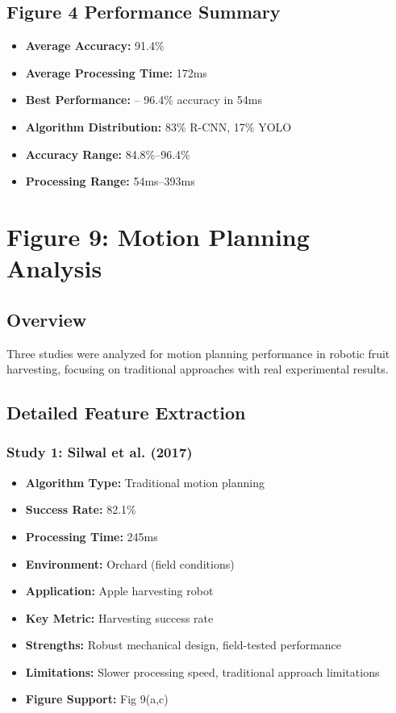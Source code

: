 \documentclass[11pt]{article}
\begin{document}
\subsection{Figure 4 Performance Summary}
\begin{itemize}
    \item \textbf{Average Accuracy:} 91.4\%
    \item \textbf{Average Processing Time:} 172ms
    \item \textbf{Best Performance:} \cite{liu2020yolo} -- 96.4\% accuracy in 54ms
    \item \textbf{Algorithm Distribution:} 83\% R-CNN, 17\% YOLO
    \item \textbf{Accuracy Range:} 84.8\%--96.4\%
    \item \textbf{Processing Range:} 54ms--393ms
\end{itemize}

\section{Figure 9: Motion Planning Analysis}

\subsection{Overview}
Three studies were analyzed for motion planning performance in robotic fruit harvesting, focusing on traditional approaches with real experimental results.

\subsection{Detailed Feature Extraction}

\subsubsection{Study 1: Silwal et al. (2017) \cite{silwal2017design}}
\begin{itemize}
    \item \textbf{Algorithm Type:} Traditional motion planning
    \item \textbf{Success Rate:} 82.1\%
    \item \textbf{Processing Time:} 245ms
    \item \textbf{Environment:} Orchard (field conditions)
    \item \textbf{Application:} Apple harvesting robot
    \item \textbf{Key Metric:} Harvesting success rate
    \item \textbf{Strengths:} Robust mechanical design, field-tested performance
    \item \textbf{Limitations:} Slower processing speed, traditional approach limitations
    \item \textbf{Figure Support:} Fig 9(a,c)
\end{itemize}
\end{document}
